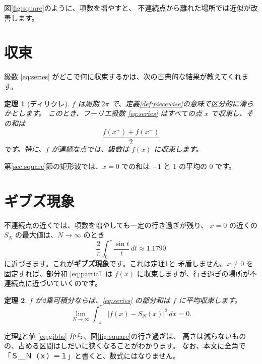 \documentclass[11pt,a4paper]{ltjsarticle}
\newtheorem{theorem}{定理}
\theoremstyle{definition}
\begin{document}
図\ref{fig:square}のように、項数を増やすと、
不連続点から離れた場所では近似が改善します。

\clearpage
\section{収束}\label{sec:convergence}
級数 \eqref{eq:series} がどこで何に収束するかは、次の古典的な結果が教えてくれます。

\begin{theorem}[ディリクレ]\label{thm:dirichlet}
$f$ は周期 $2\pi$ で、定義\ref{def:piecewise}の意味で区分的に滑らかとします。
このとき、フーリエ級数 \eqref{eq:series} はすべての点 $x$ で収束し、その和は
\[
  \frac{f(x^{+})+f(x^{-})}{2}
\]
です。特に、$f$ が連続な点では、級数は $f(x)$ に収束します。
\end{theorem}

第\ref{sec:square}節の矩形波では、$x=0$ での和は $-1$ と $1$ の平均の $0$ です。

\section{ギブズ現象}\label{sec:gibbs}
不連続点の近くでは、項数を増やしても一定の行き過ぎが残り、
$x=0$ の近くの $S_N$ の最大値は、$N\to\infty$ のとき
\begin{equation}\label{eq:gibbs}
  \frac{2}{\pi}\int_0^{\pi}\frac{\sin t}{t}\,dt \approx 1.1790
\end{equation}
に近づきます。これが\textbf{ギブズ現象}です。これは定理\ref{thm:dirichlet}と
矛盾しません。$x\neq0$ を固定すれば、部分和 \eqref{eq:partial} は
$f(x)$ に収束しますが、行き過ぎの場所が不連続点に近づいていくのです。

\begin{theorem}\label{thm:mean}
$f$ が2乗可積分ならば、\eqref{eq:series} の部分和は $f$ に平均収束します。
\[
  \lim_{N\to\infty}\int_{-\pi}^{\pi}\bigl|f(x)-S_N(x)\bigr|^2\,dx=0.
\]
\end{theorem}

定理\ref{thm:mean}と値 \eqref{eq:gibbs} から、図\ref{fig:square}の行き過ぎは、
高さは減らないものの、占める区間はしだいに狭くなることがわかります。
なお、本文に全角で「Ｓ＿Ｎ（ｘ）＝１」と書くと、数式にはなりません。
\end{document}
